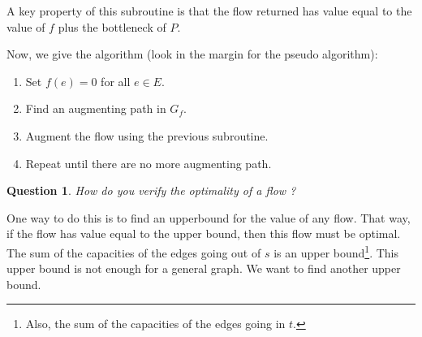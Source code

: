 \documentclass{tufte-handout}
\newtheorem{quest}[thm]{Question}
\theoremstyle{definition}
\theoremstyle{remark}
\begin{document}
A key property of this subroutine is that the flow returned has value equal to the value of $f$ plus the bottleneck of $P$.

Now, we give the algorithm (look in the margin for the pseudo algorithm):
\begin{enumerate}
	\item Set $f(e) = 0$ for all $e \in E$.
	\item Find an augmenting path in $G_f$.
	\item Augment the flow using the previous subroutine.
	\item Repeat until there are no more augmenting path.
\end{enumerate}

\begin{quest}
	How do you verify the optimality of a flow ?
\end{quest}
One way to do this is to find an upperbound for the value of any flow. That way, if the flow has value equal to the upper bound, then this flow must be optimal. The sum of the capacities of the edges going out of $s$ is an upper bound\footnote{Also, the sum of the capacities of the edges going in $t$.}. This upper bound is not enough for a general graph. We want to find another upper bound.
\end{document}
